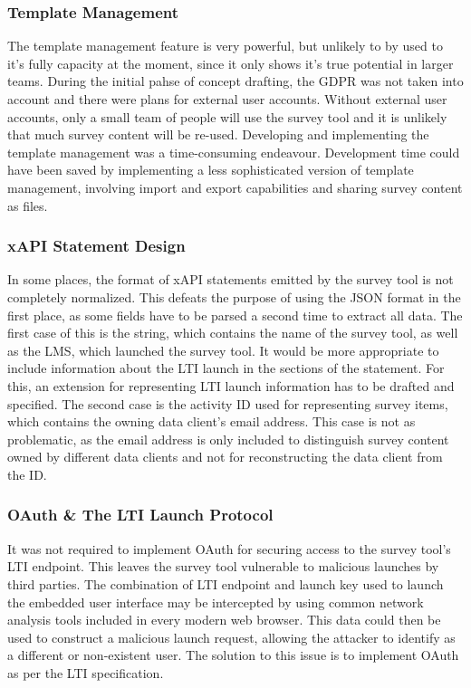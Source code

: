     	\subsubsection{Template Management}
    		The template management feature is very powerful, but unlikely to
    		by used to it's fully capacity at the moment, since it only
    		shows it's true potential in larger teams. During the initial
    		pahse of concept drafting, the GDPR was not taken into account
    		and there were plans for external user accounts. Without
    		external user accounts, only a small team of people will
    		use the survey tool and it is unlikely that much survey content
    		will be re-used. Developing and implementing the template
    		management was a time-consuming endeavour. Development
    		time could have been saved by implementing a less sophisticated
    		version of template management, involving import and export
    		capabilities and sharing survey content as files.

	   	\subsubsection{xAPI Statement Design}
	   		In some places, the format of xAPI statements emitted by
	   		the survey tool is not completely normalized. This defeats
	   		the purpose of using the JSON format in the first place,
	   		as some fields have to be parsed a second time to extract all
	   		data. The first case of this is the  string,
	   		which contains the name of the survey tool, as well as the
	   		LMS, which launched the survey tool. It would be more appropriate
	   		to include information about the LTI launch in the
	   		 sections of the statement. For this,
	   		an extension for representing LTI launch information
	   		has to be drafted and specified.
	   		The second case is the activity ID used for representing
	   		survey items, which contains the owning data client's
	   		email address. This case is not as problematic, as the
	   		email address is only included to distinguish survey
	   		content owned by different data clients and not for
	   		reconstructing the data client from the ID.

		\subsubsection{OAuth \& The LTI Launch Protocol}
			It was not required to implement OAuth for securing
			access to the survey tool's LTI endpoint.
			This leaves the survey tool vulnerable to malicious
			launches by third parties. The combination of
			LTI endpoint and launch key used to launch the embedded
			user interface may be intercepted by using common
			network analysis tools included in every modern
			web browser. This data could then be used to construct
			a malicious launch request, allowing the attacker
			to identify as a different or non-existent user.
			The solution to this issue is to implement OAuth
			as per the LTI specification.


